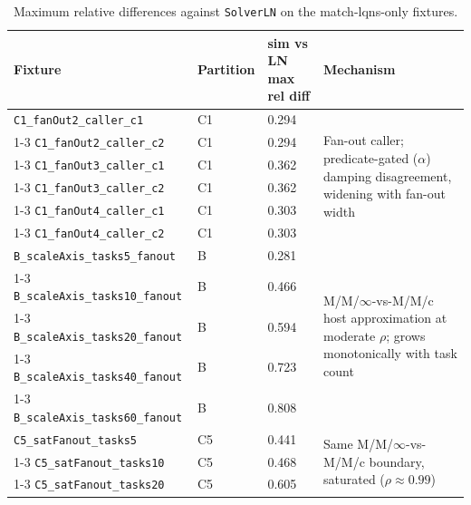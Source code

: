 \begin{table}[h]
\centering 
\small
\begin{tabularx}{\linewidth}{|l|l|l|X|}
\hline
Fixture & Partition & sim vs LN max rel diff & Mechanism \\
\hline
\texttt{C1\_fanOut2\_caller\_c1} & C1 & 0.294 & \multirow{6}{=}{Fan-out caller; predicate-gated ($\alpha$) damping disagreement, widening with fan-out width} \\
\cline{1-3}
\texttt{C1\_fanOut2\_caller\_c2} & C1 & 0.294 & \\
\cline{1-3}
\texttt{C1\_fanOut3\_caller\_c1} & C1 & 0.362 & \\
\cline{1-3}
\texttt{C1\_fanOut3\_caller\_c2} & C1 & 0.362 & \\
\cline{1-3}
\texttt{C1\_fanOut4\_caller\_c1} & C1 & 0.303 & \\
\cline{1-3}
\texttt{C1\_fanOut4\_caller\_c2} & C1 & 0.303 & \\
\hline
\texttt{B\_scaleAxis\_tasks5\_fanout}  & B & 0.281 & \multirow{5}{=}{M/M/$\infty$-vs-M/M/c host approximation at moderate $\rho$; grows monotonically with task count} \\
\cline{1-3}
\texttt{B\_scaleAxis\_tasks10\_fanout} & B & 0.466 & \\
\cline{1-3}
\texttt{B\_scaleAxis\_tasks20\_fanout} & B & 0.594 & \\
\cline{1-3}
\texttt{B\_scaleAxis\_tasks40\_fanout} & B & 0.723 & \\
\cline{1-3}
\texttt{B\_scaleAxis\_tasks60\_fanout} & B & 0.808 & \\
\hline
\texttt{C5\_satFanout\_tasks5}  & C5 & 0.441 & \multirow{3}{=}{Same M/M/$\infty$-vs-M/M/c boundary, saturated ($\rho \approx 0.99$)} \\
\cline{1-3}
\texttt{C5\_satFanout\_tasks10} & C5 & 0.468 & \\
\cline{1-3}
\texttt{C5\_satFanout\_tasks20} & C5 & 0.605 & \\
\hline
\end{tabularx}
\caption{Maximum relative differences against \texttt{SolverLN} on the match-lqns-only fixtures.}
\label{tab:eval-divergent-partitions-reldiff}
\end{table}

